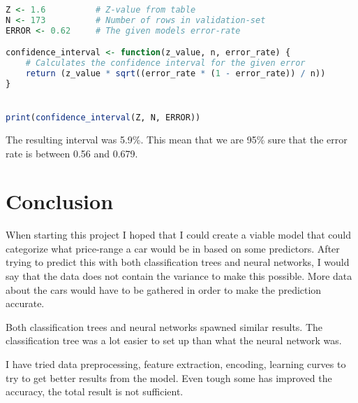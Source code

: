 \documentclass[a4paper, 12pt]{article}
\begin{document}
\begin{lstlisting}[language=R]
Z <- 1.6          # Z-value from table
N <- 173          # Number of rows in validation-set
ERROR <- 0.62     # The given models error-rate

confidence_interval <- function(z_value, n, error_rate) {
    # Calculates the confidence interval for the given error
    return (z_value * sqrt((error_rate * (1 - error_rate)) / n))
}


print(confidence_interval(Z, N, ERROR))
\end{lstlisting}

The resulting interval was 5.9\%. This mean that we are 95\% sure that the error rate is between 0.56 and 0.679.
\section{Conclusion}
When starting this project I hoped that I could create a viable model that could categorize what price-range a car would be in based on some predictors. After trying to predict this with both classification trees and neural networks, I would say that the data does not contain the variance to make this possible. More data about the cars would have to be gathered in order to make the prediction accurate.

Both classification trees and neural networks spawned similar results. The classification tree was a lot easier to set up than what the neural network was.

I have tried data preprocessing, feature extraction, encoding, learning curves to try to get better results from the model. Even tough some has improved the accuracy, the total result is not sufficient.


\clearpage


\end{document}
